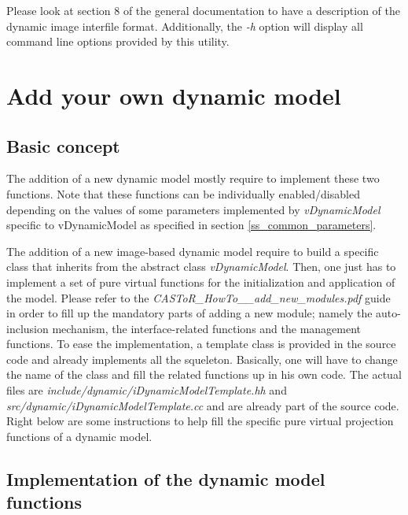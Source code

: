 \documentclass[a4paper, 11pt]{article}
\begin{document}
\bigskip
Please look at section 8 of the general documentation to have a description of the dynamic image interfile format. Additionally, the \textit{-h} option will display all command line options provided by this utility.


\clearpage
\section{Add your own dynamic model}
\label{section_add_own_dynamic_model}

\subsection{Basic concept}


The addition of a new dynamic model mostly require to implement these two functions. Note that these functions can be individually enabled/disabled depending on the values of some parameters implemented by \textit{vDynamicModel} specific to vDynamicModel as specified in section \ref{ss_common_parameters}.


The addition of a new image-based dynamic model require to build a specific class that inherits from the abstract class \textit{vDynamicModel}. Then, one just has to implement a set of pure virtual functions for the initialization and application of the model. Please refer to the \textit{CASToR\_HowTo\_\_add\_new\_modules.pdf} guide in order to fill up the mandatory parts of adding a new module; namely the auto-inclusion mechanism, the interface-related functions and the management functions. To ease the implementation, a template class is provided in the source code and already implements all the squeleton. Basically, one will have to change the name of the class and fill the related functions up in his own code. The actual files are \textit{include/dynamic/iDynamicModelTemplate.hh} and \textit{src/dynamic/iDynamicModelTemplate.cc} and are already part of the source code. Right below are some instructions to help fill the specific pure virtual projection functions of a dynamic model.
\bigskip



\subsection{Implementation of the dynamic model functions}
\end{document}
